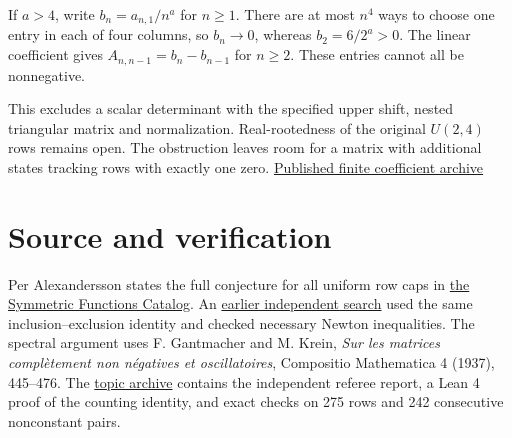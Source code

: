 \documentclass[11pt]{article}
\begin{document}
If $a>4$, write $b_n=a_{n,1}/n^a$ for $n\ge1$. There are at most $n^4$ ways to choose one entry in each of four columns, so $b_n\to0$, whereas $b_2=6/2^a>0$. The linear coefficient gives $A_{n,n-1}=b_n-b_{n-1}$ for $n\ge2$. These entries cannot all be nonnegative.

This excludes a scalar determinant with the specified upper shift, nested triangular matrix and normalization. Real-rootedness of the original $U(2,4)$ rows remains open. The obstruction leaves room for a matrix with additional states tracking rows with exactly one zero. \href{https://github.com/ProgramComputer/open-math-research/blob/main/topics/balanced-arrays/results/source_range.jsonl}{Published finite coefficient archive}

\section*{Source and verification}
Per Alexandersson states the full conjecture for all uniform row caps in
\href{https://www.symmetricfunctions.com/realRootedOpenProblems.htm\#conjBalancedArrays}{the Symmetric Functions Catalog}.
An \href{https://github.com/1337isnot1337/solved-conjectures/issues/165\#issuecomment-7058747753}{earlier independent search}
used the same inclusion--exclusion identity and checked necessary Newton inequalities.
The spectral argument uses F. Gantmacher and M. Krein,
\emph{Sur les matrices complètement non négatives et oscillatoires}, Compositio Mathematica 4 (1937), 445--476.
The \href{https://github.com/ProgramComputer/open-math-research/tree/main/topics/balanced-arrays}{topic archive}
contains the independent referee report, a Lean 4 proof of the counting identity, and exact checks on 275 rows and 242 consecutive nonconstant pairs.
\end{document}
